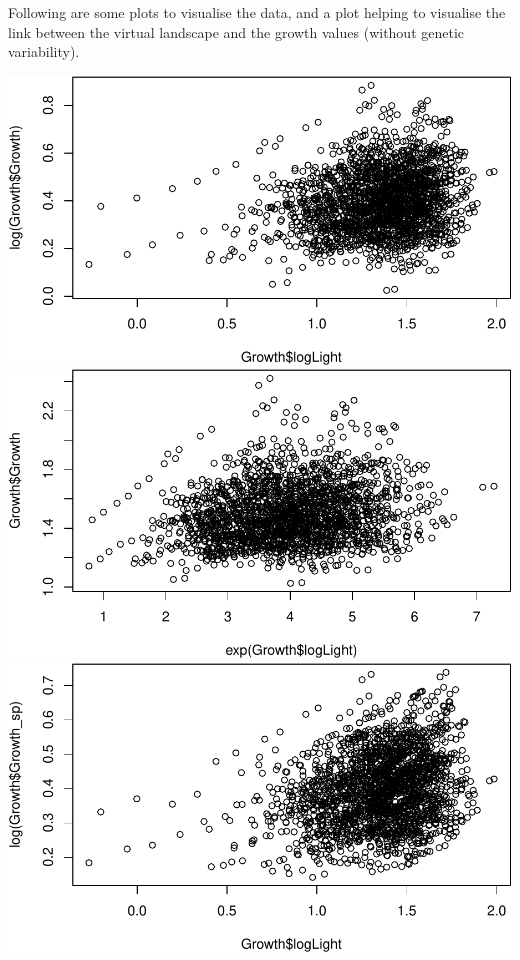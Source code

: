 \documentclass[
]{article}
\begin{document}
Following are some plots to visualise the data, and a plot helping to
visualise the link between the virtual landscape and the growth values
(without genetic variability).

\includegraphics{theoretical_model_files/figure-latex/Growth plots-1.pdf}
\includegraphics{theoretical_model_files/figure-latex/Growth plots-2.pdf}
\includegraphics{theoretical_model_files/figure-latex/Growth plots-3.pdf}
\end{document}
